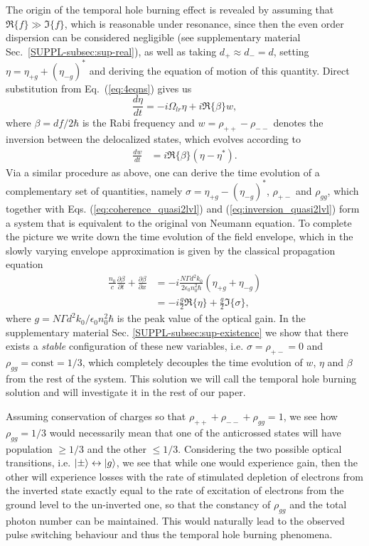 \documentclass[reprint,secnumarabic,amssymb, nobibnotes, aip, prd]{revtex4-1}
\def\p{\partial}
\begin{document}
The origin of the temporal hole burning effect is revealed by assuming that $\Re\{f\} \gg \Im\{f\} $, which is reasonable under resonance, since then the even order dispersion can be considered negligible\cite{khurgin2005optical} (see supplementary material Sec.~\ref{SUPPL-subsec:sup-real}), as well as taking $d_{+}\approx d_{-} = d$, setting  $\eta = \eta_{+g}+(\eta_{-g})^*$ and deriving the equation of motion of this quantity. Direct substitution from Eq.~(\ref{eq:4eqns}) gives us
\begin{equation}
\label{eq:coherence_quasi2lvl}
\frac{d \eta}{dt} = -i\Omega_{lr} \eta + i\Re\{\beta\}w, 
\end{equation}
where  $\beta =d f/2\hbar$ is the Rabi frequency and $w = \rho_{++}-\rho_{--}$ denotes the inversion between the delocalized states, which evolves according to 
\begin{align}
\label{eq:inversion_quasi2lvl}
\frac{d w }{dt}	&=  i\Re\{\beta\}(\eta-\eta^*).
\end{align}
Via a similar procedure as above, one can derive the time evolution of a complementary set of quantities, namely $\sigma =\eta_{+g}-(\eta_{-g})^*$, $\rho_{+-}$ and $\rho_{gg}$, which together with Eqs. (\ref{eq:coherence_quasi2lvl}) and (\ref{eq:inversion_quasi2lvl}) form a system that is equivalent to the original von Neumann equation. To complete the picture we write down the time evolution of the field envelope, which in the slowly varying envelope approximation is given by the classical propagation equation~\cite{jirauschek2014modeling}
\begin{align}
\label{eq:propagation-eq}
\frac{n_0}{c}\frac{\p \beta}{\p t} + \frac{\p \beta}{\p x} &= - i\frac{N\Gamma d^2 k_0}{2\epsilon_0n_0^2\hbar}(\eta_{+g}+\eta_{-g}) \nonumber \\
&=  -i\frac{g}{2}\Re\{\eta\}+\frac{g}{2}\Im\{\sigma\},
\end{align}
where $g =N\Gamma d^2 k_0/\epsilon_0n_0^2\hbar $ is the peak value of the optical gain. In the supplementary material Sec. \ref{SUPPL-subsec:sup-existence} we show that there exists a \emph{stable} configuration of these new variables, i.e. $\sigma = \rho_{+-} = 0$ and $\rho_{gg} = \text{const} = 1/3$, which completely decouples the time evolution of $w$, $\eta$ and $\beta$ from the rest of the system. This solution we will call the temporal hole burning solution and will investigate it in the rest of our paper.

Assuming conservation of charges so that $\rho_{++}+\rho_{--}+\rho_{gg} = 1$, we see how $\rho_{gg}= 1/3$  would necessarily mean that one of the anticrossed states will have population $\geq 1/3$ and the other $\leq 1/3$. Considering the two possible optical transitions, i.e.  $\ket{\pm}\leftrightarrow \ket{g}$, we see that while one would experience gain, then the other will experience losses with the rate of stimulated depletion of electrons from the inverted state exactly equal to the rate of excitation of electrons from the ground level to the un-inverted one, so that the constancy of $\rho_{gg}$ and the total photon number can be maintained. This would naturally lead to the observed pulse switching behaviour and thus the temporal hole burning phenomena. 
\end{document}
